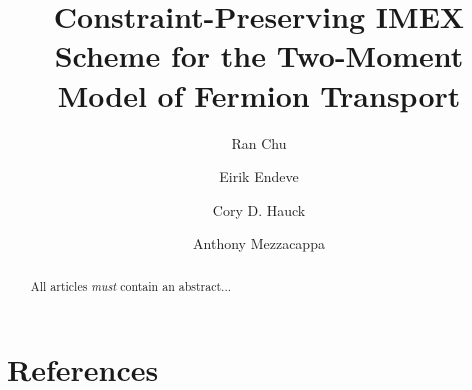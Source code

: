 \documentclass[a4paper]{jpconf}
\begin{document}
\title{Constraint-Preserving IMEX Scheme for the Two-Moment Model of Fermion Transport}

\author{Ran Chu}
\address{Department of Physics and Astronomy, University of Tennessee Knoxville, TN 37996-1200}

\author{Eirik Endeve}
\address{Department of Physics and Astronomy, University of Tennessee Knoxville, TN 37996-1200}
\address{Computational and Applied Mathematics Group, Oak Ridge National Laboratory, Oak Ridge, TN 37831 USA}

\author{Cory D. Hauck}
\address{Department of Mathematics, University of Tennessee Knoxville, TN 37996-1320}
\address{Computational and Applied Mathematics Group, Oak Ridge National Laboratory, Oak Ridge, TN 37831 USA}

\author{Anthony Mezzacappa}
\address{Department of Physics and Astronomy, University of Tennessee Knoxville, TN 37996-1200}

\begin{abstract}
All articles {\it must} contain an abstract...
\end{abstract}







\section*{References}

\end{document}
